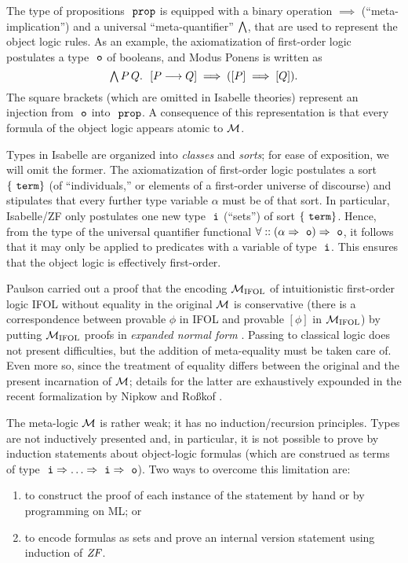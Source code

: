The type of propositions $\prop$ is equipped with a binary operation
${\implies}$ (“meta-implication”) and a universal “meta-quantifier”
$\textstyle\bigwedge$, that are used to represent the object
logic rules. As an example, the axiomatization of first-order logic
postulates a type $\tyo$ of booleans, and Modus Ponens
is written as
\[
  \ALL P\,Q.\ \ [P\limp Q] \implies ([P] \implies [Q]).
\]
The square brackets (which are omitted in Isabelle theories) represent
an injection from $\tyo$ into $\prop$. %
A consequence of this representation is that every formula of
the object logic appears atomic to $\mathcal{M}$.

Types in Isabelle are organized into \emph{classes} and \emph{sorts};
for ease of exposition, we will omit the former.  The axiomatization
of first-order logic postulates a sort $\{\type{term}\}$ (of
“individuals,” or elements of a first-order universe of discourse) and
stipulates that every further type variable $\alpha$ must be of that
sort. In particular, Isabelle/ZF only postulates one new type $\tyi$
(“sets”) of sort $\{\type{term}\}$. Hence, from the type of the universal
quantifier functional $\forall :: (\alpha \fun \tyo) \fun \tyo$, it
follows that it may only be applied to predicates with a variable of
type $\tyi$. This ensures that the object logic is effectively
first-order.

Paulson  \cite{Paulson1989} carried out a proof that the encoding
$\mathcal{M}_{\mathrm{IFOL}}$ of
intuitionistic first-order logic IFOL without equality  in the original $\mathcal{M}$ is
conservative (there is a correspondence between provable $\phi$ in
IFOL and provable $[\phi]$ in $\mathcal{M}_{\mathrm{IFOL}}$) by putting
$\mathcal{M}_{\mathrm{IFOL}}$ proofs in \emph{expanded normal form}
\cite{MR0387024}. Passing to classical logic does not present
difficulties, but the addition of meta-equality must be taken care of.
Even more so, since the treatment of equality differs between the
original and the present incarnation of $\mathcal{M}$; details for the
latter are exhaustively expounded in the recent formalization by
Nipkow and Roßkof \cite{10.1007/978-3-030-79876-5_6}.

The meta-logic $\mathcal{M}$ is rather weak; it has no induction/recursion
principles. Types are not inductively presented and, in particular, it
is not possible to prove by induction statements about
object-logic formulas (which are construed as terms of type $\tyi \fun
\dots \fun \tyi \fun \tyo$). Two ways to overcome this limitation are:
\begin{enumerate}
\item
  to construct the
  proof of each instance of the statement by hand or by programming on
  ML; or 
\item
  to encode formulas as sets and prove an internal version statement
  using induction of $\mathit{ZF}$.
\end{enumerate}

